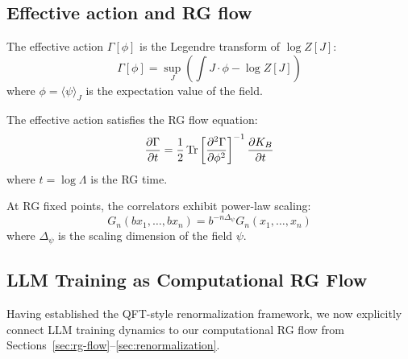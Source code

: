 \subsection{Effective action and RG flow}

\begin{definition}
\label{def:effective_action_training}
The effective action $\Gamma[\phi]$ is the Legendre transform of $\log Z[J]$:
\begin{equation}
  \Gamma[\phi] = \sup_J \left( \int J \cdot \phi - \log Z[J] \right)
  \label{eq:effective_action}
\end{equation}
where $\phi = \langle \psi \rangle_J$ is the expectation value of the field.
\end{definition}

\begin{theorem}
\label{thm:rg_flow_training}
The effective action satisfies the RG flow equation:
\begin{equation}
  \frac{\partial \Gamma}{\partial t} = \frac{1}{2} \Tr \left[ \frac{\partial^2 \Gamma}{\partial \phi^2} \right]^{-1} \frac{\partial K_B}{\partial t}
  \label{eq:rg_flow}
\end{equation}
where $t = \log \Lambda$ is the RG time.
\end{theorem}

\begin{proposition}
\label{prop:fixed_points_scaling}
At RG fixed points, the correlators exhibit power-law scaling:
\begin{equation}
  G_n(bx_1,\ldots,bx_n) = b^{-n \Delta_\psi} G_n(x_1,\ldots,x_n)
  \label{eq:scaling_correlators}
\end{equation}
where $\Delta_\psi$ is the scaling dimension of the field $\psi$.
\end{proposition}

\subsection{LLM Training as Computational RG Flow}
\label{sec:llm-rg-connection}

Having established the QFT-style renormalization framework, we now explicitly connect LLM training dynamics to our computational RG flow from Sections~\ref{sec:rg-flow}--\ref{sec:renormalization}.

